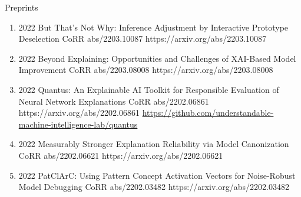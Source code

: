 \documentclass[10pt,a4paper]{article} %
\begin{document}
\headedsection %
{Preprints}{}
{
    \begin{enumerate}

        \item {}
                            {2022}
                            {But That's Not Why: Inference Adjustment by Interactive Prototype Deselection}
                            {CoRR abs/2203.10087}
                            {https://arxiv.org/abs/2203.10087}

        \item {}
                            {2022}
                            {Beyond Explaining: Opportunities and Challenges of XAI-Based Model Improvement}
                            {CoRR abs/2203.08008}
                            {https://arxiv.org/abs/2203.08008}

        \item {}
                            {2022}
                            {Quantus: An Explainable AI Toolkit for Responsible Evaluation of Neural Network Explanations}
                            {CoRR abs/2202.06861}
                            {https://arxiv.org/abs/2202.06861}
                            {\href{https://github.com/understandable-machine-intelligence-lab/quantus}{https://github.com/understandable-machine-intelligence-lab/quantus}}

        \item {}
                            {2022}
                            {Measurably Stronger Explanation Reliability via Model Canonization}
                            {CoRR abs/2202.06621}
                            {https://arxiv.org/abs/2202.06621}

        \item {}
                            {2022}
                            {PatClArC: Using Pattern Concept Activation Vectors for Noise-Robust Model Debugging}
                            {CoRR abs/2202.03482}
                            {https://arxiv.org/abs/2202.03482}


\end{enumerate}}
\end{document}
